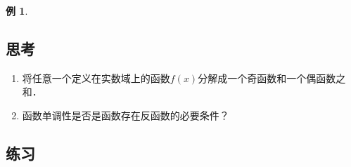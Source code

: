 \documentclass[a4paper,punct=CCT]{ctexbook}
\makeatletter
\theoremstyle{definition}
\newtheorem*{example*}{例}
\theoremstyle{remark}
\newif\ifshowex
\newif\ifshowsolp
\renewcommand*{\proofname}{证}
\renewenvironment{proof}[1][\proofname]{\par
  \pushQED{\qed}%
  \normalfont \topsep6\p@\@plus6\p@\relax
  \trivlist
  \item[\hskip\labelsep
    \bfseries
    #1%
    ]\ignorespaces
}{%
  \popQED\endtrivlist\@endpefalse
}
\makeatother
\begin{document}
\begin{example*}
\begin{proof}
  \end{proof}
\end{example*}

\subsection*{思考}

\begin{enumerate}
\item 将任意一个定义在实数域上的函数\(f(x)\)分解成一个奇函数和一个偶函数之和．

  \ifshowsolp
  参见奇偶性定义后面的\hyperlink{T:evenodd}{定理}．
  \fi

\item 函数单调性是否是函数存在反函数的必要条件？

  \ifshowsolp
  不是．反例：函数\(y = 1/x\)在定义域上不是单调的，但是存在反函数且反函数就是它自己．
  \fi
\end{enumerate}

\ifshowex
{}
\subsection*{练习}
\end{document}
